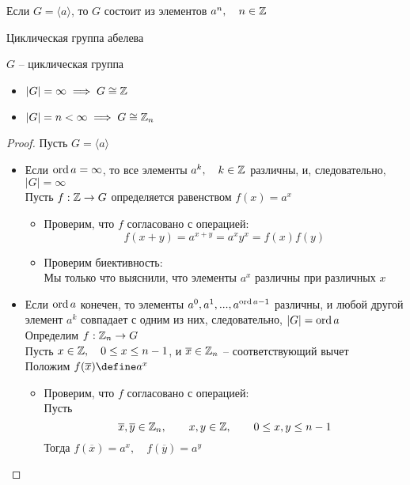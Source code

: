 \begin{props}
	\item Если $ G = \langle a \rangle $, то $ G $ состоит из элементов $ a^n, \quad n \in \mathbb{Z} $
	\item Циклическая группа абелева
\end{props}

\begin{theorem}
	$ G $ -- циклическая группа
	\begin{itemize}
		\item $ |G| = \infty \implies G \cong \mathbb{Z} $
		\item $ |G| = n < \infty \implies G \cong \mathbb{Z}_n $
	\end{itemize}
\end{theorem}

\begin{proof}
	Пусть $ G = \langle a \rangle $
	\begin{itemize}
		\item Если $ \operatorname{ord} a = \infty $, то все элементы $ a^k, \quad k \in \mathbb{Z} $ различны, и, следовательно, $ |G| = \infty $ \\
		Пусть $ f : \mathbb{Z} \to G $ определяется равенством $ f(x) = a^x $
		\begin{itemize}
			\item Проверим, что $ f $ согласовано с операцией:
			$$ f(x + y) = a^{x + y} = a^xy^x = f(x)f(y) $$
			\item Проверим биективность: \\
			Мы только что выяснили, что элементы $ a^x $ различны при различных $ x $
		\end{itemize}
		\item Если $ \operatorname{ord} a $ конечен, то элементы $ a^0, a^1, ..., a^{\operatorname{ord} a - 1} $ различны, и любой другой элемент $ a^k $ совпадает с одним из них, следовательно, $ |G| = \operatorname{ord} a $ \\
		Определим $ f : \mathbb{Z}_n \to G $ \\
		Пусть $ x \in \mathbb{Z}, \quad 0 \le x \le n - 1 $, и $ \overline{x} \in \mathbb{Z}_n $ -- соответствующий вычет \\
		Положим $ f(\overline{x}) \define a^x $
		\begin{itemize}
			\item Проверим, что $ f $ согласовано с операцией: \\
			Пусть
			$$ \overline{x}, \overline{y} \in \mathbb{Z}_n, \qquad x, y \in \mathbb{Z}, \qquad 0 \le x, y \le n - 1 $$
			Тогда $ f(\overline{x}) = a^x, \quad f(\overline{y}) = a^y $ \\

\end{itemize}
\end{itemize}
\end{proof}
